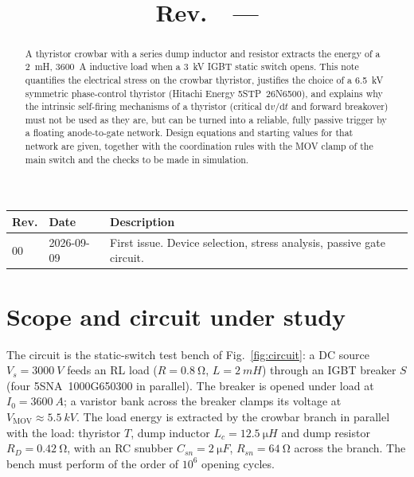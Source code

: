 \documentclass[11pt,a4paper]{article}
\title{\textbf{\doctitle}\\[6pt]\large \docsubtitle\\[10pt]\normalsize Rev.~\docrev\ --- \docdate}
\author{}
\date{}
\begin{document}
\maketitle
\thispagestyle{fancy}

\begin{center}
\begin{tabular}{@{}lll@{}}
\toprule
\textbf{Rev.} & \textbf{Date} & \textbf{Description} \\
\midrule
00 & 2026-09-09 & First issue. Device selection, stress analysis, passive gate circuit. \\
\bottomrule
\end{tabular}
\end{center}

\begin{abstract}
A thyristor crowbar with a series dump inductor and resistor extracts the energy
of a \SI{2}{mH}, \SI{3600}{A} inductive load when a \SI{3}{kV} IGBT static switch
opens. This note quantifies the electrical stress on the crowbar thyristor,
justifies the choice of a \SI{6.5}{kV} symmetric phase-control thyristor (Hitachi
Energy 5STP~26N6500), and explains why the intrinsic self-firing mechanisms of a
thyristor (critical $\mathrm{d}v/\mathrm{d}t$ and forward breakover) must not be
used as they are, but can be turned into a reliable, fully passive trigger by a
floating anode-to-gate network. Design equations and starting values for that
network are given, together with the coordination rules with the MOV clamp of the
main switch and the checks to be made in simulation.
\end{abstract}

\section{Scope and circuit under study}

The circuit is the static-switch test bench of Fig.~\ref{fig:circuit}: a DC source
$V_s = \SI{3000}{V}$ feeds an RL load ($R = \SI{0.8}{\ohm}$, $L = \SI{2}{mH}$)
through an IGBT breaker $S$ (four 5SNA~1000G650300 in parallel). The breaker is
opened under load at $I_0 = \SI{3600}{A}$; a varistor bank across the breaker
clamps its voltage at $V_{\mathrm{MOV}} \approx \SI{5.5}{kV}$. The load energy is
extracted by the crowbar branch in parallel with the load: thyristor $T$, dump
inductor $L_c = \SI{12.5}{\micro H}$ and dump resistor $R_D = \SI{0.42}{\ohm}$,
with an RC snubber $C_{sn} = \SI{2}{\micro F}$, $R_{sn} = \SI{64}{\ohm}$ across the
branch. The bench must perform of the order of $10^6$ opening cycles.
\end{document}
